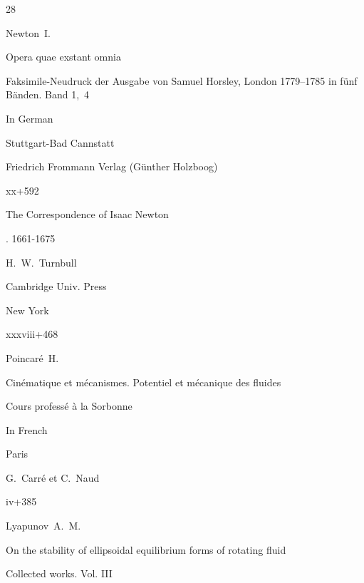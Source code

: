 \begin{thebibliography}{28}




\by Newton~I.

\book Opera quae exstant omnia

\bookinfo Faksimile-Neudruck der Ausgabe von Samuel Horsley, London 1779--1785 in f\"unf B\"anden. Band 1,~4

\lang In German


\publaddr Stuttgart-Bad Cannstatt

\publ Friedrich Frommann Verlag (G\"unther Holzboog)

\totalpages xx+592





\book The Correspondence of Isaac Newton

. 1661-1675

\ed H.~W.~Turnbull

\publ Cambridge Univ. Press

\publaddr New York


\totalpages xxxviii+468 






\by Poincar\'e~H.

\book Cin\'ematique et m\'ecanismes. Potentiel et m\'ecanique des fluides

\bookinfo Cours profess\'e \`a la Sorbonne

\lang In French


\publaddr Paris

\publ G.~Carr\'e et C.~Naud

\totalpages iv+385 





\by Lyapunov~A.~M.

\paper On the stability of ellipsoidal equilibrium forms of rotating fluid

\inbook Collected works. \rm  Vol. III



\end{thebibliography}
